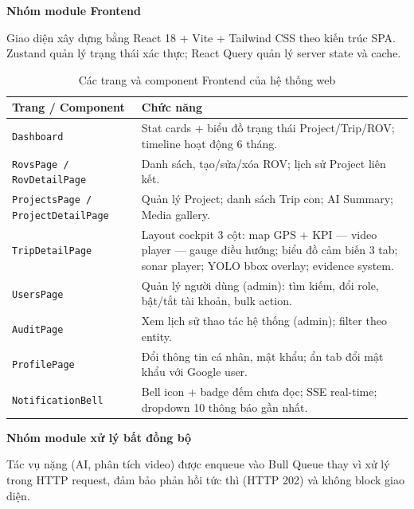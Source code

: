 \documentclass[../DoAn.tex]{subfiles}
\begin{document}
\subsubsubsection\textbf{Nhóm module Frontend}

Giao diện xây dựng bằng React 18 + Vite + Tailwind CSS theo kiến trúc SPA. Zustand quản lý trạng thái xác thực; React Query quản lý server state và cache.

\begin{table}[H]
\centering
\renewcommand{\arraystretch}{1.3}
\begin{tabular}{|p{4.5cm}|p{9cm}|}
\hline
\textbf{Trang / Component} & \textbf{Chức năng} \\
\hline
\texttt{Dashboard} & Stat cards + biểu đồ trạng thái Project/Trip/ROV; timeline hoạt động 6 tháng. \\
\hline
\texttt{RovsPage / RovDetailPage} & Danh sách, tạo/sửa/xóa ROV; lịch sử Project liên kết. \\
\hline
\texttt{ProjectsPage / ProjectDetailPage} & Quản lý Project; danh sách Trip con; AI Summary; Media gallery. \\
\hline
\texttt{TripDetailPage} & Layout cockpit 3 cột: map GPS + KPI --- video player --- gauge điều hướng; biểu đồ cảm biến 3 tab; sonar player; YOLO bbox overlay; evidence system. \\
\hline
\texttt{UsersPage} & Quản lý người dùng (admin): tìm kiếm, đổi role, bật/tắt tài khoản, bulk action. \\
\hline
\texttt{AuditPage} & Xem lịch sử thao tác hệ thống (admin); filter theo entity. \\
\hline
\texttt{ProfilePage} & Đổi thông tin cá nhân, mật khẩu; ẩn tab đổi mật khẩu với Google user. \\
\hline
\texttt{NotificationBell} & Bell icon + badge đếm chưa đọc; SSE real-time; dropdown 10 thông báo gần nhất. \\
\hline
\end{tabular}
\caption{Các trang và component Frontend của hệ thống web}
\label{tab:web_frontend_modules}
\end{table}

\subsubsubsection\textbf{Nhóm module xử lý bất đồng bộ}

Tác vụ nặng (AI, phân tích video) được enqueue vào Bull Queue thay vì xử lý trong HTTP request, đảm bảo phản hồi tức thì (HTTP 202) và không block giao diện.
\end{document}
